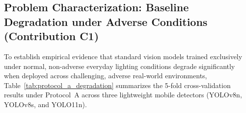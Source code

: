 \documentclass[final,5p,times,twocolumn,authoryear]{elsarticle}
\begin{document}
\subsection{Problem Characterization: Baseline Degradation under Adverse Conditions (Contribution C1)}
\label{subsec:exp_c1_degradation}

To establish empirical evidence that standard vision models trained exclusively under normal, non-adverse everyday lighting conditions degrade significantly when deployed across challenging, adverse real-world environments, Table~\ref{tab:protocol_a_degradation} summarizes the 5-fold cross-validation results under Protocol~A across three lightweight mobile detectors (YOLOv8n, YOLOv8s, and YOLO11n).

\begin{table}[t]
\centering
\renewcommand{\arraystretch}{0.7}
\caption{Cross-Condition Performance Degradation of Baselines Trained under Normal Everyday Lighting across Denomination Localization (Task 1) and Physical Tear Inspection (Task 2) (Protocol A, 5-Fold Stratified Cross-Validation on Normal Ambient Indoor/Torn-Clean, Evaluated on 1,212 Unseen Adverse Real-World Images). Note that intact environmental subsets do not contain physical tears (indicated by `—').}
\label{tab:protocol_a_degradation}
\end{table}
\end{document}
